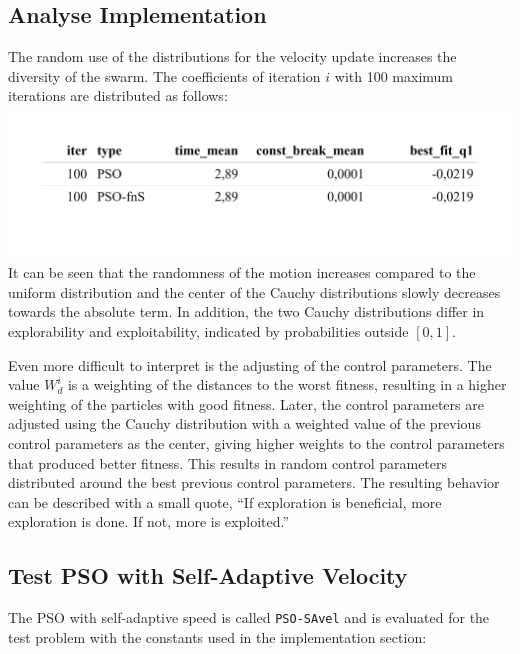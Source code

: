\documentclass[
  oneside]{book}
\begin{document}
\hypertarget{analyse-implementation}{%
\subsection{Analyse Implementation}\label{analyse-implementation}}

The random use of the distributions for the velocity update increases the diversity of the swarm. The coefficients of iteration \(i\) with 100 maximum iterations are distributed as follows:\\
\includegraphics{Master_Thesis_files/figure-latex/unnamed-chunk-11-1.png}
It can be seen that the randomness of the motion increases compared to the uniform distribution and the center of the Cauchy distributions slowly decreases towards the absolute term. In addition, the two Cauchy distributions differ in explorability and exploitability, indicated by probabilities outside \([0, 1]\).

Even more difficult to interpret is the adjusting of the control parameters. The value \(W_d^i\) is a weighting of the distances to the worst fitness, resulting in a higher weighting of the particles with good fitness. Later, the control parameters are adjusted using the Cauchy distribution with a weighted value of the previous control parameters as the center, giving higher weights to the control parameters that produced better fitness. This results in random control parameters distributed around the best previous control parameters. The resulting behavior can be described with a small quote, ``If exploration is beneficial, more exploration is done. If not, more is exploited.''

\hypertarget{test-pso-with-self-adaptive-velocity}{%
\subsection{Test PSO with Self-Adaptive Velocity}\label{test-pso-with-self-adaptive-velocity}}

The PSO with self-adaptive speed is called \texttt{PSO-SAvel} and is evaluated for the test problem with the constants used in the implementation section:
\end{document}
